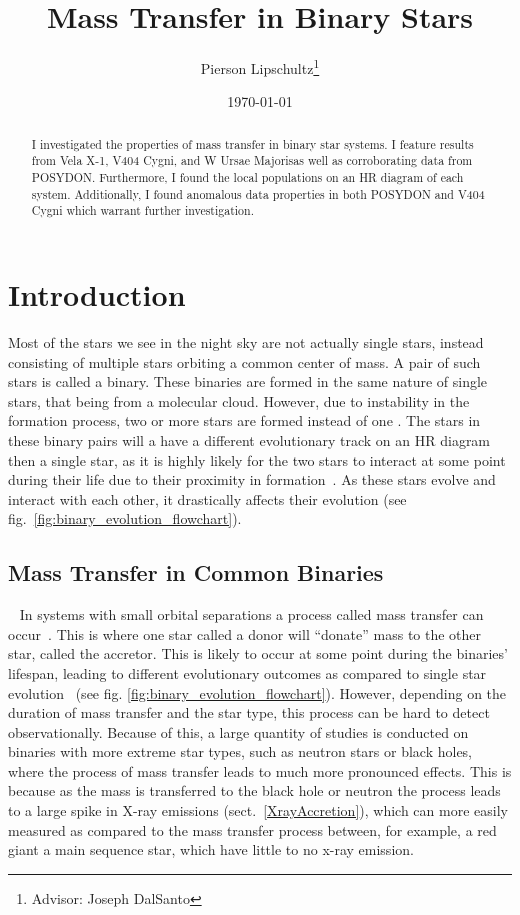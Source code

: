 \documentclass[12pt, a4paper]{article}
\title{Mass Transfer in Binary Stars}
\author{Pierson Lipschultz\thanks{Advisor: Joseph DalSanto}}
\date{\today}
\begin{document}
\maketitle
\begin{abstract}
    \normalsize
    I investigated the properties of mass transfer in binary star systems. I feature results from Vela X-1, V404 Cygni, and W Ursae Majorisas well as corroborating data from POSYDON. Furthermore, I found the local populations on an HR diagram of each system. Additionally, I found anomalous data properties in both POSYDON and V404 Cygni which warrant further investigation.

\end{abstract}

\section{Introduction} %

    Most of the stars we see in the night sky are not actually single stars, instead consisting of multiple stars orbiting a common center of mass. A pair of such stars is called a binary. These binaries are formed in the same nature of single stars, that being from a molecular cloud. However, due to instability in the formation process, two or more stars are formed instead of one \parencite{Offner_2016}. The stars in these binary pairs will a have a different evolutionary track on an HR diagram then a single star, as it is highly likely for the two stars to interact at some point during their life due to their proximity in formation~\parencite{TaurisvandenHeuvel+2023}. As these stars evolve and interact with each other, it drastically affects their evolution (see fig.~\ref{fig:binary_evolution_flowchart}).


    \subsection{Mass Transfer in Common Binaries}~\label{MassTransferinCommon}
    In systems with small orbital separations a process called mass transfer can occur~\parencite{TaurisvandenHeuvel+2023}. This is where one star called a donor will ``donate'' mass to the other star, called the accretor. This is likely to occur at some point during the binaries' lifespan, leading to different evolutionary outcomes as compared to single star evolution~\parencite{TaurisvandenHeuvel+2023} (see fig. \ref{fig:binary_evolution_flowchart}). However, depending on the duration of mass transfer and the star type, this process can be hard to detect observationally. Because of this, a large quantity of studies is conducted on binaries with more extreme star types, such as neutron stars or black holes, where the process of mass transfer leads to much more pronounced effects. This is because as the mass is transferred to the black hole or neutron the process leads to a large spike in X-ray emissions (sect.~\ref{XrayAccretion}), which can more easily measured as compared to the mass transfer process between, for example, a red giant a main sequence star, which have little to no x-ray emission. 
\end{document}
